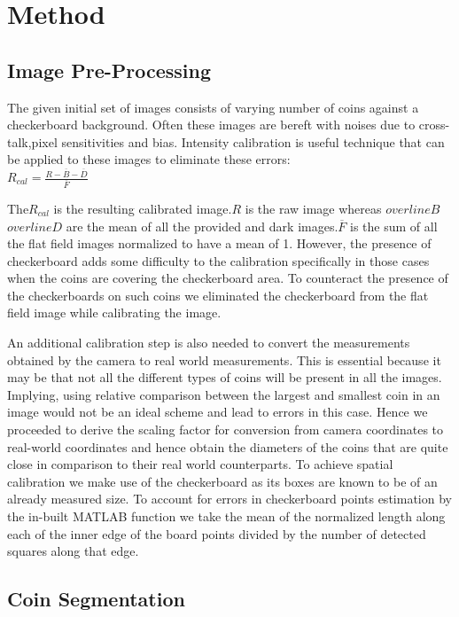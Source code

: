 \documentclass[report.tex]{subfile}
\begin{document}
\section{Method}

\subsection{Image Pre-Processing}
The given initial set of images consists of varying number of coins against a checkerboard background. Often these images are bereft with noises due to cross-talk,pixel sensitivities and bias. Intensity calibration is useful technique that can be applied to these images to eliminate these errors: \\

$R_{cal} =   \frac{R -  \overline{B}  -  \overline{D}}{\overline{F}}$

The$R_{cal}$ is the resulting calibrated image.$R$ is the raw image whereas $overline{B}$ $overline{D}$ are the mean of all the provided and dark images.$\overline{F}$ is the sum of all the flat field images normalized to have a mean of 1. However, the presence of checkerboard adds some difficulty to the calibration specifically in those cases when the coins are covering the checkerboard area. To counteract the presence of the checkerboards on such coins we eliminated the checkerboard from the flat field image while calibrating the image.

An additional calibration step is also needed to convert the measurements obtained by the camera to real world measurements. This is essential because it may be that not all the different types of coins will be present in all the images. Implying, using relative comparison between the largest and smallest coin in an image would not be an ideal scheme and lead to errors in this case. Hence we proceeded to derive the scaling factor for conversion from camera coordinates to real-world coordinates and hence obtain the diameters of the coins that are quite close in comparison to their real world counterparts. To achieve spatial calibration we make use of the checkerboard as its boxes are known to be of an already measured size. To account for errors in checkerboard points estimation by the in-built MATLAB function we take the mean of the normalized length along each of the inner edge of the board points divided by the number of detected squares along that edge.

\subsection{Coin Segmentation}
\end{document}
